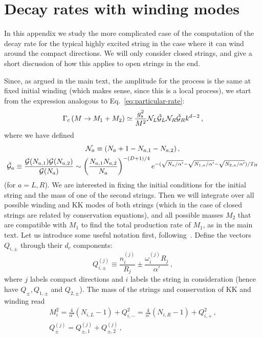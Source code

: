 \documentclass[a4paper,11pt]{article}
\newcommand{\lr}[1]{\left(#1\right)}
\begin{document}
\appendix
\section{Decay rates with winding modes}\label{sec:winding-modes}

In this appendix we study the more complicated case of the computation of the decay rate for the typical highly excited string in the case where it can wind around the compact directions.
We will only consider closed strings, and give a short discussion of how this applies to open strings in the end.

Since, as argued in the main text, the amplitude for the process is the same at fixed initial winding (which makes sense, since this is a local process), we start from the expression analogous to Eq.~\eqref{eq:particular-rate}:
\begin{equation}
    \Gamma_{c}\lr{M \rightarrow M_1+M_2}\simeq \frac{g_s^2}{M^2}\mathcal{N}_L\mathcal{\Tilde{G}}_L\mathcal{N}_R\mathcal{\Tilde{G}}_Rk^{d-2} \, ,
\end{equation}
where we have defined
\begin{gather*}
    \mathcal{N}_{a} \equiv (N_{a}+1-N_{a,1}-N_{a,2})\, , \\
    \mathcal{\Tilde{G}}_a \equiv  \frac{\mathcal{G}(N_{a,1})\mathcal{G}(N_{a,2})}{\mathcal{G}(N_a)}\sim \lr{\frac{N_{a,1}N_{a,2}}{N_a}}^{-(D+1)/4}e^{-(\sqrt{N_a/\alpha '}-\sqrt{N_{1,a}/\alpha '}-\sqrt{N_{2,a}/\alpha '})/T_H}
\end{gather*}
(for $a=L,R$).
We are interested in fixing the initial conditions for the initial string and the mass of one of the second strings.
Then we will integrate over all possible winding and KK modes of both strings (which in the case of closed strings are related by conservation equations), and all possible masses $M_2$ that are compatible with $M_1$ to find the total production rate of $M_1$, as in the main text.
Let us introduce some useful notation first, following~\cite{Chen:2005ra}.
Define the vectors $Q_{i,\pm}$ through their $d_c$ components:
\begin{equation}
    Q^{(j)}_{i,\pm}\equiv {\frac{n_i^{(j)}}{R_j}\pm \frac{\omega_i^{(j)} R_j}{\alpha'}}\, ,
\end{equation}
where $j$ labels compact directions and $i$ labels the string in consideration (hence have $Q_\pm, Q_{1,\pm}$ and $Q_{2,\pm}$).
The mass of the strings and conservation of KK and winding read
\begin{gather*}
        M_i^2=\frac{4}{\alpha'}(N_{i,L}-1)+Q_{i,-}^2=\frac{4}{\alpha '}(N_{i,R}-1)+Q_{i,+}^2\, ,\\
        Q_{\pm}^{(j)}=Q_{\pm,1}^{(j)}+Q_{\pm,2}^{(j)}\, ,
\end{gather*}
\end{document}
